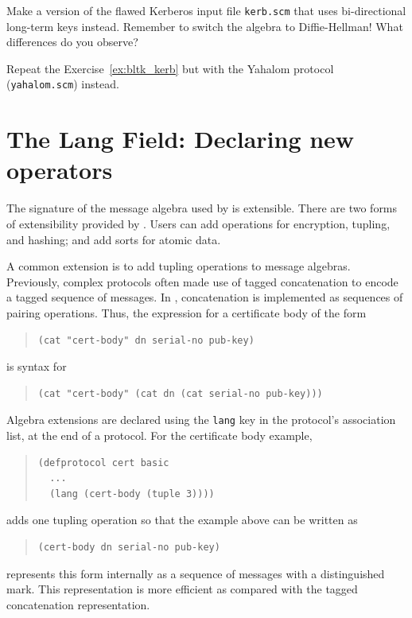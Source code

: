 \begin{exercise}
\label{ex:bltk_kerb}
Make a version of the flawed Kerberos input file \texttt{kerb.scm}
that uses bi-directional long-term keys instead.  Remember to switch
the algebra to Diffie-Hellman!  What differences do you observe?
\end{exercise}

\begin{exercise}
Repeat the Exercise~\ref{ex:bltk_kerb} but with the Yahalom protocol
(\texttt{yahalom.scm}) instead.
\end{exercise}

\section{The Lang Field:  Declaring new operators}
\label{sec:algebra:lang:field}

The signature of the message algebra used by {\cpsa} is extensible.
There are two forms of extensibility provided by {\cpsa}.  Users can
add operations for encryption, tupling, and hashing; and
add sorts for atomic data.

A common extension is to add tupling operations to message algebras.
Previously, complex protocols often made use of tagged concatenation
to encode a tagged sequence of messages.  In {\cpsa}, concatenation is
implemented as sequences of pairing operations.  Thus, the expression
for a certificate body of the form
\begin{quote}
\begin{verbatim}
(cat "cert-body" dn serial-no pub-key)
\end{verbatim}
\end{quote}
is syntax for
\begin{quote}
\begin{verbatim}
(cat "cert-body" (cat dn (cat serial-no pub-key)))
\end{verbatim}
\end{quote}

Algebra extensions are declared using the \texttt{lang} key in the
protocol's association list, at the end of a protocol.  For the
certificate body example,
\begin{quote}
\begin{verbatim}
(defprotocol cert basic
  ...
  (lang (cert-body (tuple 3))))
\end{verbatim}
\end{quote}
adds one tupling operation so that the example above can be written as
\begin{quote}
\begin{verbatim}
(cert-body dn serial-no pub-key)
\end{verbatim}
\end{quote}
{\cpsa} represents this form internally as a sequence of messages with a
distinguished mark.  This representation is more efficient as compared
with the tagged concatenation representation.

